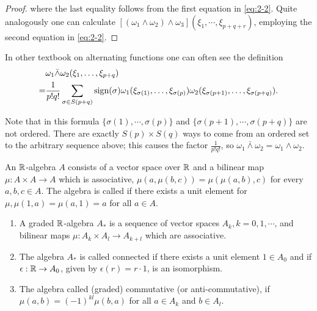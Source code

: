 \begin{proof}
  where the last equality follows from the first equation in \eqref{eq:2-2}. Quite analogously one can calculate
  $[(\omega_1\wedge\omega_2)\wedge\omega_3](\xi_1, \cdots, \xi_{p+q+r})$, employing the second equation in \eqref{eq:2-2}.
\end{proof}

\begin{remark}
In other textbook on alternating functions one can often see the definition
\begin{align*}
    & \omega_{1}\bar{\wedge}\omega_{2}(\xi_{1},\ldots,\xi_{p+q})\\
  = & \frac{1}{p!q!}\sum_{\sigma\in S(p+q)}\operatorname{sign}(\sigma)
      \omega_{1}(\xi_{\sigma(1)},\ldots,\xi_{\sigma(p)})
      \omega_{2}(\xi_{\sigma(p+1)},\ldots,\xi_{\sigma(p+q)}).
\end{align*}

Note that in this formula $\{\sigma(1), \cdots,\sigma(p)\}$ and $\{\sigma(p + 1), \cdots, \sigma(p + q)\}$ are not
ordered. There are exactly $S(p)\times S(q)$ ways to come from an ordered set to the arbitrary sequence above; 
this causes the factor $\frac{1}{p!q!}$, so $\omega_1\bar{\wedge}\omega_2 = \omega_1\wedge\omega_2$.
\end{remark}

An $\mathbb{R}$-algebra $A$ consists of a vector space over $\mathbb{R}$ and a bilinear map $\mu:A\times A\to A$
which is associative, $\mu(a, \mu(b,c)) = \mu(\mu(a, b), c)$ for every $a,b,c \in A$. The
algebra is called  if there exists a unit element for $\mu, \mu(1, a) = \mu( a, 1) = a$
for all $a\in A$.

\begin{definition}\label{def:2-11}\;\par
  \begin{enumerate}[label=(\roman*)]
    \item A graded $\mathbb{R}$-algebra $A_*$ is a sequence of vector spaces $A_k, k = 0,1, \cdots$,
      and bilinear maps $\mu:A_k\times A_l\to A_{k+l}$ which are associative.
    \item The algebra $A_*$ is called connected if there exists a unit element $1\in A_0$ and 
      if $\epsilon:\mathbb{R}\to A_0$, given by $\epsilon(r) = r\cdot 1$, is an isomorphism.
    \item The algebra called (graded) commutative (or anti-commutative), if $\mu(a, b) = (-1)^{kl}\mu(b, a)$
      for all $a\in A_k$ and $b\in A_l$.
  \end{enumerate}
\end{definition}



